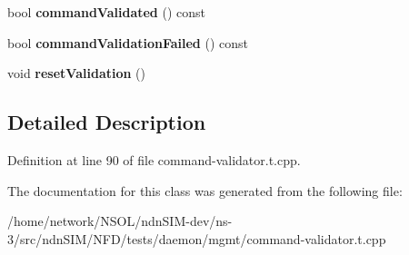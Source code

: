 \begin{DoxyCompactItemize}
\item 
bool {\bfseries command\+Validated} () const\hypertarget{classnfd_1_1tests_1_1CommandValidatorTester_ab974c1130b4a70bf3aeb731c9dd8f5c5}{}\label{classnfd_1_1tests_1_1CommandValidatorTester_ab974c1130b4a70bf3aeb731c9dd8f5c5}

\item 
bool {\bfseries command\+Validation\+Failed} () const\hypertarget{classnfd_1_1tests_1_1CommandValidatorTester_a73c00a2ae557fac96ed6ae0bf260d62a}{}\label{classnfd_1_1tests_1_1CommandValidatorTester_a73c00a2ae557fac96ed6ae0bf260d62a}

\item 
void {\bfseries reset\+Validation} ()\hypertarget{classnfd_1_1tests_1_1CommandValidatorTester_a6f2eacac0699afe161700a1416e16984}{}\label{classnfd_1_1tests_1_1CommandValidatorTester_a6f2eacac0699afe161700a1416e16984}

\end{DoxyCompactItemize}


\subsection{Detailed Description}


Definition at line 90 of file command-\/validator.\+t.\+cpp.



The documentation for this class was generated from the following file\+:\begin{DoxyCompactItemize}
\item 
/home/network/\+N\+S\+O\+L/ndn\+S\+I\+M-\/dev/ns-\/3/src/ndn\+S\+I\+M/\+N\+F\+D/tests/daemon/mgmt/command-\/validator.\+t.\+cpp\end{DoxyCompactItemize}
